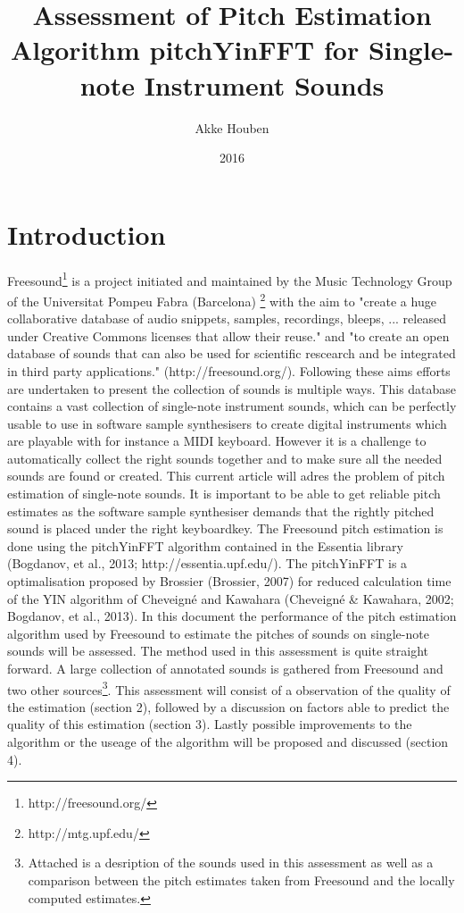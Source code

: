 \documentclass{proc}
\title{Assessment of Pitch Estimation Algorithm pitchYinFFT for Single-note Instrument Sounds}
\author{Akke Houben}
\date{2016}
\begin{document}
\maketitle

\section{Introduction}
Freesound\footnote{http://freesound.org/} is a project initiated and maintained by the Music Technology Group of the Universitat Pompeu Fabra (Barcelona) \footnote{http://mtg.upf.edu/} with the aim to "create a huge collaborative database of audio snippets, samples, recordings, bleeps, ... released under Creative Commons licenses that allow their reuse." and "to create an open database of sounds that can also be used for scientific rescearch and be integrated in third party applications." (http://freesound.org/). Following these aims efforts are undertaken to present the collection of sounds is multiple ways. This database contains a vast collection of single-note instrument sounds, which can be perfectly usable to use in software sample synthesisers to create digital instruments which are playable with for instance a MIDI keyboard. However it is a challenge to automatically collect the right sounds together and to make sure all the needed sounds are found or created. This current article will adres the problem of pitch estimation of single-note sounds. It is important to be able to get reliable pitch estimates as the software sample synthesiser demands that the rightly pitched sound is placed under the right keyboardkey. The Freesound pitch estimation is done using the pitchYinFFT algorithm contained in the Essentia library (Bogdanov, et al., 2013; http://essentia.upf.edu/). The pitchYinFFT is a optimalisation proposed by Brossier (Brossier, 2007) for reduced calculation time of the YIN algorithm of Cheveigné and Kawahara (Cheveigné \& Kawahara, 2002; Bogdanov, et al., 2013). 
In this document the performance of the pitch estimation algorithm used by Freesound to estimate the pitches of sounds on single-note sounds will be assessed. The method used in this assessment is quite straight forward. A large collection of annotated sounds is gathered from Freesound and two other sources\footnote{Attached is a desription of the sounds used in this assessment as well as a comparison between the pitch estimates taken from Freesound and the locally computed estimates.}.
 This assessment will consist of a observation of the quality of the estimation (section 2), followed by a discussion on factors able to predict the quality of this estimation (section 3). Lastly possible improvements to the algorithm or the useage of the algorithm will be proposed and discussed (section 4).
\end{document}

